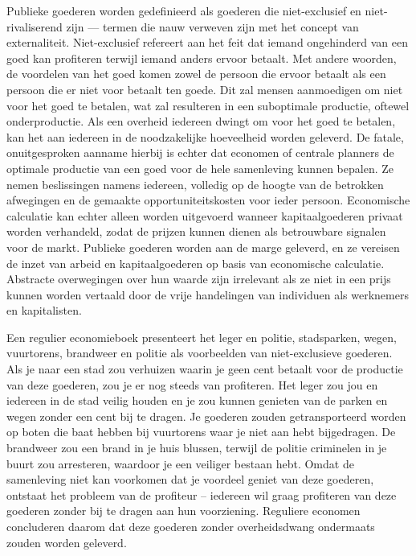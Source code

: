 \documentclass[
  a5paper,
  smalldemyvopaper,11pt,twoside,onecolumn,openright,extrafontsizes,
hidelinks]{memoir}
\begin{document}
Publieke goederen worden gedefinieerd als goederen die niet-exclusief en
niet-rivaliserend zijn --- termen die nauw verweven zijn met het concept
van externaliteit. Niet-exclusief refereert aan het feit dat iemand
ongehinderd van een goed kan profiteren terwijl iemand anders ervoor
betaalt. Met andere woorden, de voordelen van het goed komen zowel de
persoon die ervoor betaalt als een persoon die er niet voor betaalt ten
goede. Dit zal mensen aanmoedigen om niet voor het goed te betalen, wat
zal resulteren in een suboptimale productie, oftewel onderproductie. Als
een overheid iedereen dwingt om voor het goed te betalen, kan het aan
iedereen in de noodzakelijke hoeveelheid worden geleverd. De fatale,
onuitgesproken aanname hierbij is echter dat economen of centrale
planners de optimale productie van een goed voor de hele samenleving
kunnen bepalen. Ze nemen beslissingen namens iedereen, volledig op de
hoogte van de betrokken afwegingen en de gemaakte opportuniteitskosten
voor ieder persoon. Economische calculatie kan echter alleen worden
uitgevoerd wanneer kapitaalgoederen privaat worden verhandeld, zodat de
prijzen kunnen dienen als betrouwbare signalen voor de markt. Publieke
goederen worden aan de marge geleverd, en ze vereisen de inzet van
arbeid en kapitaalgoederen op basis van economische calculatie.
Abstracte overwegingen over hun waarde zijn irrelevant als ze niet in
een prijs kunnen worden vertaald door de vrije handelingen van
individuen als werknemers en kapitalisten.

Een regulier economieboek presenteert het leger en politie, stadsparken,
wegen, vuurtorens, brandweer en politie als voorbeelden van
niet-exclusieve goederen. Als je naar een stad zou verhuizen waarin je
geen cent betaalt voor de productie van deze goederen, zou je er nog
steeds van profiteren. Het leger zou jou en iedereen in de stad veilig
houden en je zou kunnen genieten van de parken en wegen zonder een cent
bij te dragen. Je goederen zouden getransporteerd worden op boten die
baat hebben bij vuurtorens waar je niet aan hebt bijgedragen. De
brandweer zou een brand in je huis blussen, terwijl de politie
criminelen in je buurt zou arresteren, waardoor je een veiliger bestaan
hebt. Omdat de samenleving niet kan voorkomen dat je voordeel geniet van
deze goederen, ontstaat het probleem van de profiteur -- iedereen wil
graag profiteren van deze goederen zonder bij te dragen aan hun
voorziening. Reguliere economen concluderen daarom dat deze goederen
zonder overheidsdwang ondermaats zouden worden geleverd.
\end{document}
